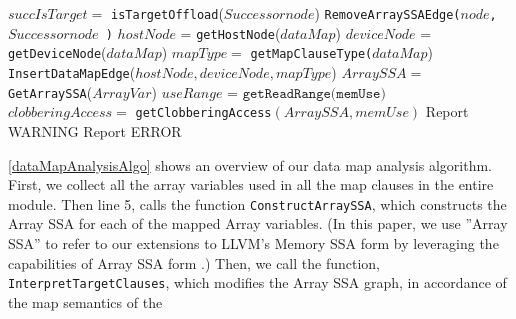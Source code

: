 \begin{algorithm}[!htbp]
\begin{algorithmic}[1]
                \State $succIsTarget =$ \texttt{isTargetOffload}($Successornode$)
                    \State \texttt{RemoveArraySSAEdge($node$, $Successornode$ )}
                \EndIf                                                
            \EndFor 
        \EndFor 
            \State $hostNode$ = \texttt{getHostNode}($dataMap$)
            \State $deviceNode$ = \texttt{getDeviceNode}($dataMap$)
            \State $mapType =$ \texttt{getMapClauseType(}$ dataMap$)
                    \State {}
                    \State \texttt{InsertDataMapEdge}($hostNode, deviceNode, 
                    mapType$)
        \EndFor
        \EndFunction
            \State $ArraySSA =$ \texttt{GetArraySSA}($ArrayVar$)
                \State $useRange$ = $\texttt{getReadRange(memUse)}$
                \State $clobberingAccess =$ \texttt{getClobberingAccess}$(ArraySSA, memUse)$
                    \State Report WARNING 
                    \State Report ERROR 
                \EndIf
            \EndFor
        \EndFor    
        \EndFunction
    \end{algorithmic}
\end{algorithm}
\autoref{dataMapAnalysisAlgo} shows an overview 
of our data map analysis algorithm. First, we 
collect all the array variables used in all the 
map clauses in the entire module.
Then line 5, calls the function \texttt{ConstructArraySSA}, 
which constructs the Array SSA for each of the mapped Array variables. 
(In this paper, we use ''Array SSA'' to refer to our extensions to 
LLVM's Memory SSA form by leveraging the capabilities of Array SSA form \cite{Knobe:1998:ASF:268946.268956}.)
Then, we call the function, \texttt{InterpretTargetClauses}, 
which modifies the Array SSA graph, in accordance of the map semantics of the 
